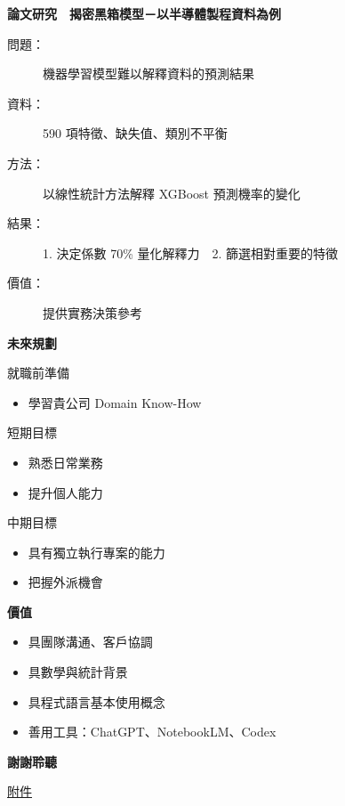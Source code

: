 \documentclass[12pt,aspectratio=169]{beamer}
\begin{document}
\begin{frame}{\textbf{論文研究　揭密黑箱模型－以半導體製程資料為例}}
  \begin{description}
    \item[問題：] 機器學習模型難以解釋資料的預測結果
    \vspace{1em}
    \item[資料：] 590 項特徵、缺失值、類別不平衡
    \vspace{1em}
    \item[方法：] 以線性統計方法解釋 XGBoost 預測機率的變化
    \vspace{1em}
    \item[結果：] 1. 決定係數 70\% 量化解釋力　2. 篩選相對重要的特徵
    \vspace{1em}
    \item[價值：] 提供實務決策參考
  \end{description}
\end{frame}

\begin{frame}{\textbf{未來規劃}}
  \begin{block}{就職前準備}
    \begin{itemize}
      \item 學習貴公司 Domain Know-How
    \end{itemize}
  \end{block}
  \begin{block}{短期目標}
    \begin{itemize}
      \item 熟悉日常業務
      \item 提升個人能力
    \end{itemize}
  \end{block}
  \begin{block}{中期目標}
    \begin{itemize}
      \item 具有獨立執行專案的能力
      \item 把握外派機會
    \end{itemize}
  \end{block}
\end{frame}

\begin{frame}{\textbf{價值}}
  \begin{itemize}
    \item 具團隊溝通、客戶協調
    \vspace{1em}
    \item 具數學與統計背景
    \vspace{1em}
    \item 具程式語言基本使用概念
    \vspace{1em}
    \item 善用工具：ChatGPT、NotebookLM、Codex
  \end{itemize}
\end{frame}

\begin{frame}
  \vspace{3cm}
  \centering
  \Huge{\textbf{謝謝聆聽}}
  
  \vspace{3cm}
  \small\href{https://drive.google.com/file/d/1lE5E7IaBIESfK62EoWuBSgFOo_zypsXs/view?usp=sharing}{附件}
\end{frame}
\end{document}
